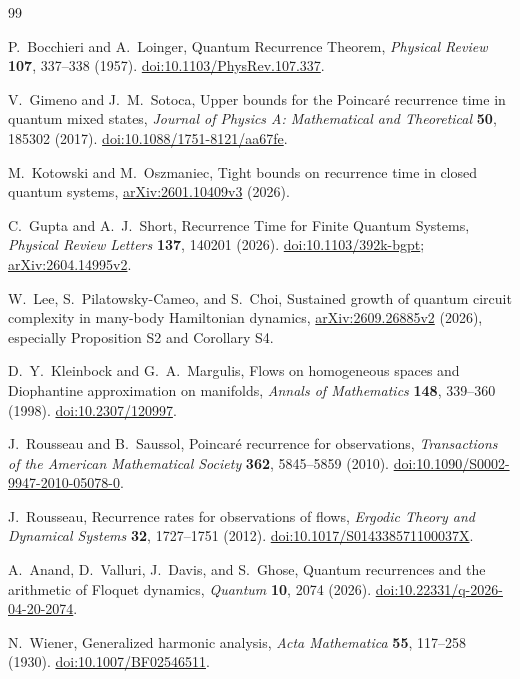 {\raggedright
\begin{thebibliography}{99}

P.~Bocchieri and A.~Loinger,
Quantum Recurrence Theorem,
\emph{Physical Review} \textbf{107}, 337--338 (1957).
\href{https://doi.org/10.1103/PhysRev.107.337}{doi:10.1103/PhysRev.107.337}.

V.~Gimeno and J.~M.~Sotoca,
Upper bounds for the Poincar\'e recurrence time in quantum mixed states,
\emph{Journal of Physics A: Mathematical and Theoretical}
\textbf{50}, 185302 (2017).
\href{https://doi.org/10.1088/1751-8121/aa67fe}{doi:10.1088/1751-8121/aa67fe}.

M.~Kotowski and M.~Oszmaniec,
Tight bounds on recurrence time in closed quantum systems,
\href{https://arxiv.org/abs/2601.10409v3}{arXiv:2601.10409v3} (2026).

C.~Gupta and A.~J.~Short,
Recurrence Time for Finite Quantum Systems,
\emph{Physical Review Letters} \textbf{137}, 140201 (2026).
\href{https://doi.org/10.1103/392k-bgpt}{doi:10.1103/392k-bgpt};
\href{https://arxiv.org/abs/2604.14995v2}{arXiv:2604.14995v2}.

W.~Lee, S.~Pilatowsky-Cameo, and S.~Choi,
Sustained growth of quantum circuit complexity in many-body Hamiltonian
dynamics,
\href{https://arxiv.org/abs/2609.26885v2}{arXiv:2609.26885v2}
(2026), especially Proposition S2 and Corollary S4.

D.~Y.~Kleinbock and G.~A.~Margulis,
Flows on homogeneous spaces and Diophantine approximation on manifolds,
\emph{Annals of Mathematics} \textbf{148}, 339--360 (1998).
\href{https://doi.org/10.2307/120997}{doi:10.2307/120997}.

J.~Rousseau and B.~Saussol,
Poincar\'e recurrence for observations,
\emph{Transactions of the American Mathematical Society}
\textbf{362}, 5845--5859 (2010).
\href{https://doi.org/10.1090/S0002-9947-2010-05078-0}
{doi:10.1090/S0002-9947-2010-05078-0}.

J.~Rousseau,
Recurrence rates for observations of flows,
\emph{Ergodic Theory and Dynamical Systems}
\textbf{32}, 1727--1751 (2012).
\href{https://doi.org/10.1017/S014338571100037X}
{doi:10.1017/S014338571100037X}.

A.~Anand, D.~Valluri, J.~Davis, and S.~Ghose,
Quantum recurrences and the arithmetic of Floquet dynamics,
\emph{Quantum} \textbf{10}, 2074 (2026).
\href{https://doi.org/10.22331/q-2026-04-20-2074}
{doi:10.22331/q-2026-04-20-2074}.

N.~Wiener,
Generalized harmonic analysis,
\emph{Acta Mathematica} \textbf{55}, 117--258 (1930).
\href{https://doi.org/10.1007/BF02546511}{doi:10.1007/BF02546511}.

\end{thebibliography}
}
